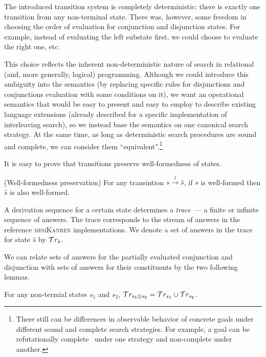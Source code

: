 The introduced transition system is completely deterministic: there is exactly one transition from any non-terminal state.
There was, however, some freedom in choosing the order of evaluation for conjunction and
disjunction states. For example, instead of evaluating the left substate first, we could choose to evaluate the right one, etc.
\begin{comment}
In each concrete case, we would
end up with a different (but still deterministic) system that would prescribe different semantics to a concrete goal.
\end{comment}
This choice reflects the inherent non-deterministic nature of search in relational (and, more generally, logical) programming.
Although we could introduce this ambiguity into the semantics (by replacing specific rules for disjunctions and conjunctions evaluation with some conditions on it), we want an operational semantics that would be easy to present and easy to employ to describe existing language extensions (already described for a specific implementation of interleaving search), so we instead base the semantics on one canonical search strategy.
At the same time, as long as deterministic search procedures are sound and complete, we can consider them ``equivalent''.\footnote{There still can be differences in observable behavior of concrete goals under different sound and complete search strategies.
For example, a goal can be refutationally complete~\cite{WillThesis} under one strategy and non-complete under another.}

It is easy to prove that transitions preserve well-formedness of states.

\begin{lemma}{(Well-formedness preservation)}
\label{lem:well_formedness_preservation}
For any transintion $s \xrightarrow{l} \hat{s}$, if $s$ is well-formed then $\hat{s}$ is also well-formed.
\end{lemma}

A derivation sequence for a certain state determines a \emph{trace}~--- a finite or infinite sequence of answers. The trace corresponds to the stream of answers
in the reference \textsc{miniKanren} implementations. We denote a set of answers in the trace for state $\hat{s}$ by $\mathcal{T}r_{\hat{s}}$.

We can relate sets of answers for the partially evaluated conjunction and disjunction with sets of answers for their constituents by the two following lemmas.

\begin{lemma}
\label{lem:sum_answers}
For any non-termial states $s_1$ and $s_2$, $\mathcal{T}r_{s_1 \oplus s_2} = \mathcal{T}r_{s_1} \cup \mathcal{T}r_{s_2}$.
\end{lemma}


